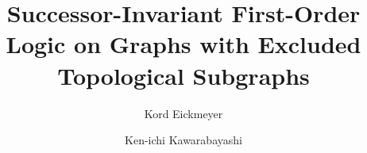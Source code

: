 \documentclass[12pt]{amsart}
\begin{document}
\title[succ-inv FO on Graphs with excl. top. subgraphs]{Successor-Invariant First-Order Logic on Graphs with Excluded
  Topological Subgraphs}
\author{Kord Eickmeyer}
\address{Technical University Darmstadt, Department of Mathematics, Schlossgartenstr. 7, 64289 Darmstadt, Germany}

\author{Ken-ichi Kawarabayashi}
\address{National Inst. of Informatics and JST, ERATO, Kawarabayashi Large Graph Project, Hitotsubashi 2-1-2, Tokyo 101-8430, Japan}





\let\realbfseries=\bfseries
\def\bfseries{\realbfseries\boldmath}
\end{document}
